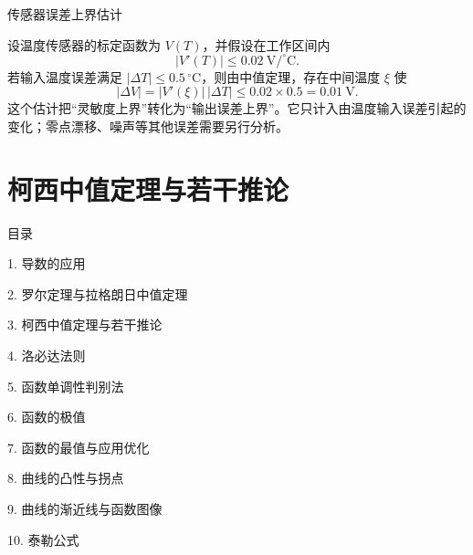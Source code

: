\documentclass[aspectratio=169,10pt,fontset=fandol]{ctexbeamer}
\begin{document}
\begin{frame}[t,fragile]{传感器误差上界估计}
\normalsize
{\normalsize
\begin{application}[工程：传感器误差上界]
设温度传感器的标定函数为 $V(T)$，并假设在工作区间内
\[
|V'(T)|\leq0.02\ \mathrm{V/^{\circ}C}.
\]
若输入温度误差满足 $|\Delta T|\leq0.5\,^{\circ}\mathrm C$，则由中值定理，存在中间温度 $\xi$ 使
\[
|\Delta V|=|V'(\xi)|\,|\Delta T|
\leq0.02\times0.5
=0.01\ \mathrm V.
\]
这个估计把“灵敏度上界”转化为“输出误差上界”。它只计入由温度输入误差引起的变化；零点漂移、噪声等其他误差需要另行分析。
\end{application}
}
\end{frame}
\section{柯西中值定理与若干推论}
\begin{frame}[t,fragile]{目录}
\normalsize
{\color{black}\normalsize 1. 导数的应用\par}\vspace{0.22em}
{\color{black}\normalsize 2. 罗尔定理与拉格朗日中值定理\par}\vspace{0.22em}
{\color{blue}\normalsize 3. 柯西中值定理与若干推论\par}\vspace{0.22em}
{\color{gray!40}\normalsize 4. 洛必达法则\par}\vspace{0.22em}
{\color{gray!40}\normalsize 5. 函数单调性判别法\par}\vspace{0.22em}
{\color{gray!40}\normalsize 6. 函数的极值\par}\vspace{0.22em}
{\color{gray!40}\normalsize 7. 函数的最值与应用优化\par}\vspace{0.22em}
{\color{gray!40}\normalsize 8. 曲线的凸性与拐点\par}\vspace{0.22em}
{\color{gray!40}\normalsize 9. 曲线的渐近线与函数图像\par}\vspace{0.22em}
{\color{gray!40}\normalsize 10. 泰勒公式\par}\vspace{0.22em}
\end{frame}
\end{document}
